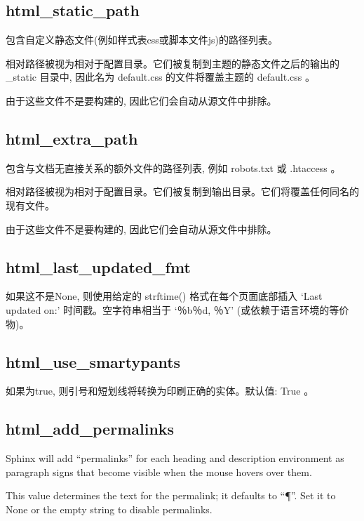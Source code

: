 \documentclass[a4paper,10pt,english]{sphinxmanual}
\begin{document}
\subsection{html\_static\_path}
\label{\detokenize{sphinx_conf:html-static-path}}
\sphinxAtStartPar
包含自定义静态文件(例如样式表css或脚本文件js)的路径列表。

\sphinxAtStartPar
相对路径被视为相对于配置目录。它们被复制到主题的静态文件之后的输出的 \_static 目录中,
因此名为 default.css 的文件将覆盖主题的 default.css 。

\sphinxAtStartPar
由于这些文件不是要构建的, 因此它们会自动从源文件中排除。


\subsection{html\_extra\_path}
\label{\detokenize{sphinx_conf:html-extra-path}}
\sphinxAtStartPar
包含与文档无直接关系的额外文件的路径列表, 例如 robots.txt 或 .htaccess 。

\sphinxAtStartPar
相对路径被视为相对于配置目录。它们被复制到输出目录。它们将覆盖任何同名的现有文件。

\sphinxAtStartPar
由于这些文件不是要构建的, 因此它们会自动从源文件中排除。


\subsection{html\_last\_updated\_fmt}
\label{\detokenize{sphinx_conf:html-last-updated-fmt}}
\sphinxAtStartPar
如果这不是None, 则使用给定的 strftime() 格式在每个页面底部插入 ‘Last updated on:’ 时间戳。空字符串相当于 ‘％b％d, ％Y’ (或依赖于语言环境的等价物)。


\subsection{html\_use\_smartypants}
\label{\detokenize{sphinx_conf:html-use-smartypants}}
\sphinxAtStartPar
如果为true, 则引号和短划线将转换为印刷正确的实体。默认值: True 。


\subsection{html\_add\_permalinks}
\label{\detokenize{sphinx_conf:html-add-permalinks}}
\sphinxAtStartPar
Sphinx will add “permalinks” for each heading and description environment as paragraph signs that become visible when the mouse hovers over them.

\sphinxAtStartPar
This value determines the text for the permalink; it defaults to “¶”. Set it to None or the empty string to disable permalinks.
\end{document}
